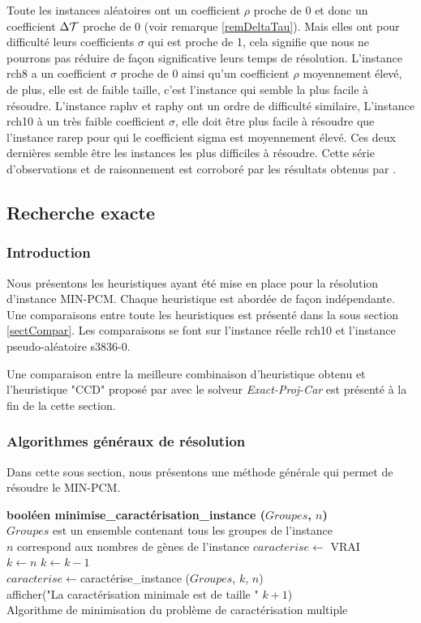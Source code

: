Toute les instances aléatoires ont un coefficient $\rho$ proche de 0 et donc un coefficient $\Delta\cal{T}$ proche de 0 (voir remarque \ref{remDeltaTau}). Mais elles ont pour difficulté leurs coefficients $\sigma$ qui est proche de 1, cela signifie que nous ne pourrons pas réduire de façon significative leurs temps de résolution. L'instance rch8 a un coefficient $\sigma$ proche de 0 ainsi qu'un coefficient $\rho$ moyennement élevé, de plus, elle est de faible taille, c'est l'instance qui semble la plus facile à résoudre. L'instance raphv et raphy ont un ordre de difficulté similaire,  L'instance rch10 à un très faible coefficient $\sigma$, elle doit être plus facile à résoudre que l'instance rarep pour qui le coefficient sigma est moyennement élevé. Ces deux dernières semble être les instances les plus difficiles à résoudre. Cette série d'observations et de raisonnement est corroboré par les résultats obtenus par \cite{Chhel2013}.

\subsection{Recherche exacte}
\subsubsection{Introduction}
Nous présentons les heuristiques ayant été mise en place pour la résolution d'instance MIN-PCM. Chaque heuristique est abordée de façon indépendante. Une comparaisons entre toute les heuristiques est présenté dans la sous section \ref{sectCompar}. Les comparaisons se font sur l'instance réelle rch10 et l'instance pseudo-aléatoire s3836-0.

Une comparaison entre la meilleure combinaison d'heuristique obtenu et l'heuristique "CCD" proposé par \cite{Chhel2013} avec le solveur \textit{Exact-Proj-Car} est présenté à la fin de la cette section.
\subsubsection{Algorithmes généraux de résolution}

Dans cette sous section, nous présentons une méthode générale qui permet de résoudre le MIN-PCM.

\begin{algorithm}
	\textbf{booléen minimise\_caractérisation\_instance ($Groupes$, $n$)}\\
	\tcp
	{
		$Groupes$ est un ensemble contenant tous les groupes de l'instance\\
		$n$ correspond aux nombres de gènes de l'instance
	}
	$caracterise \leftarrow$ VRAI\\
	$k \leftarrow n$ 
	{
		$k \leftarrow k-1$\\
		$caracterise \leftarrow $caractérise\_instance ($Groupes$, $k$, $n$)\\
	}
	afficher("La caractérisation minimale est de taille " $k+1$)\\
	\caption{Algorithme de minimisation du problème de caractérisation multiple}
	\label{algoMinPCM}
\end{algorithm}

